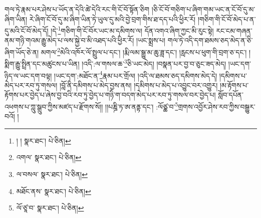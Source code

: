 གལ་ཏེ་རྣམ་པར་ཤེས་པ་ཡོད་ན་དེའི་ཚེ་དེའི་རང་གི་ངོ་བོ་སྟོན་ཅིག །ཅི་ངོ་བོ་གཅིག་པ་ཞིག་གམ་ཡང་ན་ངོ་བོ་དུ་མ་ཞིག་ཡིན། རེ་ཞིག་ངོ་བོ་དུ་མ་ཞིག་ཡིན་ཏེ་ཡུལ་དུ་མའི་བྱེ་བྲག་གིས་ཐ་དད་པའི་ཕྱིར་རོ། །གཅིག་གི་ངོ་བོ་མེད་པ་ན་དུ་མའི་ངོ་བོ་མེད་དོ། །དེ་\footnote{། །  སྣར་ཐང་།  པེ་ཅིན། }གཅིག་གི་ངོ་བོར་ཡང་མ་དམིགས་ལ། དོན་འགའ་ཞིག་ཀྱང་མི་རུང་སྟེ། རང་ངམ་གཞན་ནམ་གཉི་གའམ་རྒྱུ་མེད་པ་ལས་སྐྱེ་བ་མི་འཐད་པའི་ཕྱིར་རོ། །ཡང་སྨྲས་པ། གལ་ཏེ་འདི་དག་ཐམས་ཅད་མེད་ན་ཅི་ཞིག་ཡོད་ཅེ་ན། མགལ་\footnote{འགལ་  སྣར་ཐང་།  པེ་ཅིན། }མེའི་འཁོར་ལོ་སྤྲུལ་པ་དང་། །རྨི་ལམ་སྒྱུ་མ་ཆུ་ཟླ་དང་། །རླངས་པ་ཕུག་གི་བྲག་ཅ་དང་། །སྨིག་རྒྱུ་སྤྲིན་དང་མཚུངས་པ་ཡིན། །འདི་:ལ་གསལ་ཆ་\footnote{ལ་བསལ་  སྣར་ཐང་།  པེ་ཅིན། }ཅི་ཡང་མེད། །བསྣན་པར་བྱ་བ་ཅུང་ཟད་མེད། །ཡང་དག་ཉིད་ལ་ཡང་དག་བལྟ། །ཡང་དག་:མཐོང་ན་\footnote{མཐོང་ནས་  སྣར་ཐང་།  པེ་ཅིན། }རྣམ་པར་གྲོལ། །འདི་ལ་ཐམས་ཅད་དམིགས་མེད་དེ། །དམིགས་པ་མེད་པར་རབ་ཏུ་གསལ། །བློ་ནི་དམིགས་པ་མེད་བྱས་ནས། །དམིགས་པ་མེད་པ་འབྱུང་བར་འགྱུར། །མ་རྟོགས་པ་རྟོགས་པར་བྱེད་པ་ཞེས་བྱ་བའི་རབ་ཏུ་བྱེད་པ་གཉི་ག་བདག་མེད་པར་རབ་ཏུ་གསལ་བར་བྱེད་པ། སློབ་དཔོན་འཕགས་པ་ཀླུ་སྒྲུབ་ཀྱིས་མཛད་པ་རྫོགས་སོ།། །།པཎྜི་ཏ་ཨ་ནནྟ་དང་། :ལོཙྪ་བ་\footnote{ལོ་ཙཱ་བ་  སྣར་ཐང་།  པེ་ཅིན། }གྲགས་འབྱོར་ཤེས་རབ་ཀྱིས་བསྒྱུར་བའོ། ། 